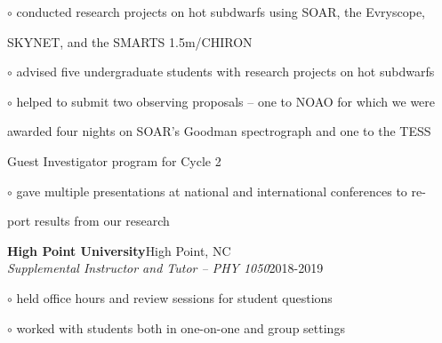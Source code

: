 \documentclass[letterpaper,12pt]{article}
\begin{document}
\begin{minipage}{6.1in}
\hspace{0.5in} $\circ$ conducted research projects on hot subdwarfs using SOAR, the Evryscope,

\hspace{0.69in}SKYNET, and the SMARTS 1.5m/CHIRON 

\hspace{0.5in} $\circ$ advised five undergraduate students with research projects on hot subdwarfs

\hspace{0.5in} $\circ$ helped to submit two observing proposals -- one to NOAO for which we were

\vspace{-0.5mm}
\hspace{0.69in}awarded four nights on SOAR's Goodman spectrograph and one to the TESS 

\vspace{-0.5mm}
\hspace{0.69in}Guest Investigator program for Cycle 2

\hspace{0.5in} $\circ$ gave multiple presentations at national and international conferences to re-

\vspace{-0.5mm}
\hspace{0.69in}port results from our research

\vspace{2mm}
\textbf{High Point University}\hfill High Point, NC\\
\textit{Supplemental Instructor and Tutor -- PHY 1050}\hfill 2018-2019

\hspace{0.5in} $\circ$ held office hours and review sessions for student questions

\hspace{0.5in} $\circ$ worked with students both in one-on-one and group settings

\end{minipage}

\newpage
\vspace{6mm}
\noindent{}
\end{document}
